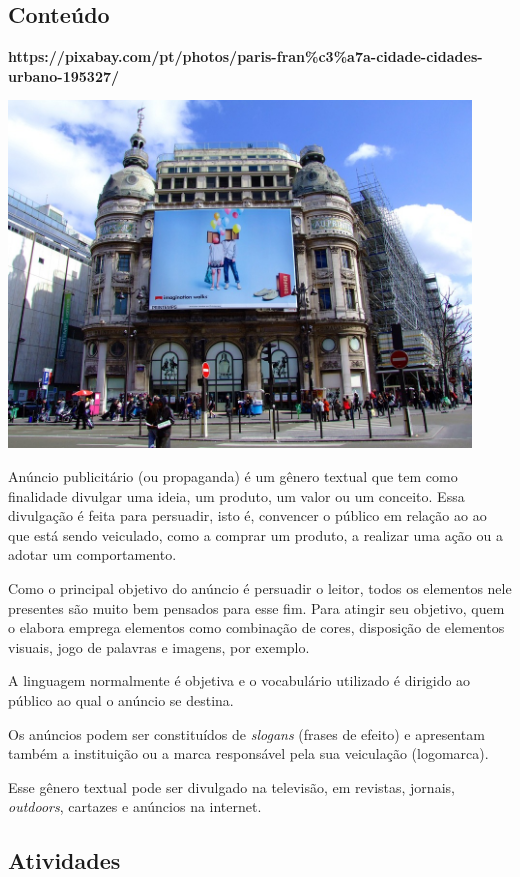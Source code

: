 \subsection{Conteúdo}\label{conteuxfado-3}

\textbf{https://pixabay.com/pt/photos/paris-fran\%c3\%a7a-cidade-cidades-urbano-195327/}

\includegraphics[width=4.83333in,height=3.62500in]{media/image8.jpeg}

Anúncio publicitário (ou propaganda) é um gênero textual que
tem como finalidade divulgar uma ideia, um produto, um valor ou um
conceito. Essa divulgação é feita para persuadir, isto é, convencer o
público em relação ao ao que está sendo veiculado, como a comprar um
produto, a realizar uma ação ou a adotar um comportamento.

Como o principal objetivo do anúncio é persuadir o leitor,
todos os elementos nele presentes são muito bem pensados para esse fim. Para atingir
seu objetivo, quem o elabora emprega elementos como
combinação de cores, disposição de elementos visuais, jogo de palavras e
imagens, por exemplo.

A linguagem normalmente é objetiva e o vocabulário utilizado é dirigido
ao público ao qual o anúncio se destina.

Os anúncios podem ser constituídos de \emph{slogans} (frases de efeito)
e apresentam também a instituição ou a marca responsável pela sua
veiculação (logomarca).

Esse gênero textual pode ser divulgado na televisão, em revistas,
jornais, \emph{outdoors}, cartazes e anúncios na internet.

\subsection{Atividades}\label{atividades-3}


